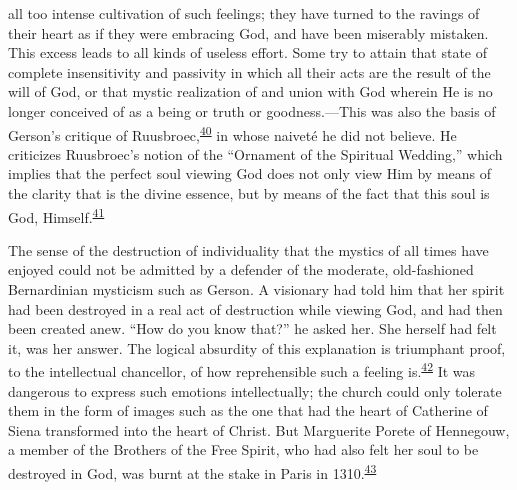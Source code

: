 all too intense cultivation of such feelings; they have
\protect\hypertarget{15_Chapter_Eight__RELIGIOUS_EXCITAT.xhtmlux5cux23page_229}{}{}turned
to the ravings of their heart as if they were embracing God, and have
been miserably mistaken. This excess leads to all kinds of useless
effort. Some try to attain that state of complete insensitivity and
passivity in which all their acts are the result of the will of God, or
that mystic realization of and union with God wherein He is no longer
conceived of as a being or truth or goodness.---This was also the basis
of Gerson's critique of
Ruusbroec,\textsuperscript{\protect\hypertarget{15_Chapter_Eight__RELIGIOUS_EXCITAT.xhtmlux5cux23id_827}{\protect\hyperlink{23_NOTES.xhtmlux5cux23id_828}{40}}}
in whose naiveté he did not believe. He criticizes Ruusbroec's notion of
the ``Ornament of the Spiritual Wedding,'' which implies that the
perfect soul viewing God does not only view Him by means of the clarity
that is the divine essence, but by means of the fact that this soul is
God,
Himself.\textsuperscript{\protect\hypertarget{15_Chapter_Eight__RELIGIOUS_EXCITAT.xhtmlux5cux23id_825}{\protect\hyperlink{23_NOTES.xhtmlux5cux23id_826}{41}}}

The sense of the destruction of individuality that the mystics of all
times have enjoyed could not be admitted by a defender of the moderate,
old-fashioned Bernardinian mysticism such as Gerson. A visionary had
told him that her spirit had been destroyed in a real act of destruction
while viewing God, and had then been created anew. ``How do you know
that?'' he asked her. She herself had felt it, was her answer. The
logical absurdity of this explanation is triumphant proof, to the
intellectual chancellor, of how reprehensible such a feeling
is.\textsuperscript{\protect\hypertarget{15_Chapter_Eight__RELIGIOUS_EXCITAT.xhtmlux5cux23id_824}{\protect\hyperlink{23_NOTES.xhtmlux5cux23page_424}{42}}}
It was dangerous to express such emotions intellectually; the church
could only tolerate them in the form of images such as the one that had
the heart of Catherine of Siena transformed into the heart of Christ.
But Marguerite Porete of Hennegouw, a member of the Brothers of the Free
Spirit, who had also felt her soul to be destroyed in God, was burnt at
the stake in Paris in
1310.\textsuperscript{\protect\hypertarget{15_Chapter_Eight__RELIGIOUS_EXCITAT.xhtmlux5cux23id_822}{\protect\hyperlink{23_NOTES.xhtmlux5cux23id_823}{43}}}

